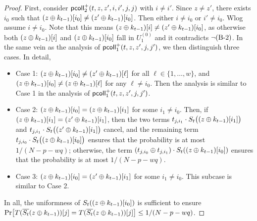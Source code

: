 \documentclass[journal=tosc,final,nohyperref]{iacrtrans}
\begin{document}
\begin{proof}
	
	First, consider $\mathsf{pcoll}_{2}^+(t,z,z',i,i',j,j)$ with $i\neq i'$. Since $z\neq z'$, there exists $i_0$ such that $(z\oplus k_{t-1})[i_0]\neq(z'\oplus k_{t-1})[i_0]$. Then either $i\neq i_0$ or $i'\neq i_0$. Wlog assume $i\neq i_0$. Note that this means $(z\oplus k_{t-1})[i]\neq(z'\oplus k_{t-1})[i_0]$, as otherwise both $(z\oplus k_{t-1})[i]$ and $(z\oplus k_{t-1})[i_0]$ fall in $U_1^{(0)}$ and it contradicts $\neg\text{(B-2)}$. In the same vein as the analysis of $\mathsf{pcoll}_{1}^+(t,z,z',j,j')$, we then distinguish three cases. In detail,
	\begin{itemize}
		\item Case 1: $(z\oplus k_{t-1})[i_0]\neq(z'\oplus k_{t-1})[\ell]$ for all $\ell\in\{1,\ldots,w\}$, and $(z\oplus k_{t-1})[i_0]\neq(z\oplus k_{t-1})[\ell]$ for any $\ell\neq i_0$. Then the analysis is similar to Case 1 in the analysis of $\mathsf{pcoll}_{1}^+(t,z,z',j,j')$.
		\item Case 2: $(z\oplus k_{t-1})[i_0]=(z\oplus k_{t-1})[i_1]$ for some $i_1\neq i_0$. Then, if $(z\oplus k_{t-1})[i_1]=(z'\oplus k_{t-1})[i_1]$, then the two terms $t_{j,i_1}\cdot S_t\big((z\oplus k_{t-1})[i_1]\big)$ and $t_{j,i_1}\cdot S_t\big((z'\oplus k_{t-1})[i_1]\big)$ cancel, and the remaining term $t_{j,i_0}\cdot S_t\big((z\oplus k_{t-1})[i_0]\big)$ ensures that the probability is at most $1/(N-p-wq)$; otherwise, the term $(t_{j,i_0}\oplus t_{j,i_1})\cdot S_t((z\oplus k_{t-1})[i_0])$ ensures that the probability is at most $1/(N-p-wq)$.
		\item Case 3: $(z\oplus k_{t-1})[i_0]=(z'\oplus k_{t-1})[i_1]$ for some $i_1\neq i_0$. This subcase is similar to Case 2.
	\end{itemize}
	In all, the uniformness of $S_t((z\oplus k_{t-1})[i_0])$ is sufficient to ensure ${\Pr}\big[T(\overline{S_t}(z\oplus k_{t-1}))[j]=T(\overline{S_t}(z\oplus k_{t-1}))[j]\big]\leq1/(N-p-wq)$.
	
	
	
	\arrangespace
	

\end{proof}
\end{document}
